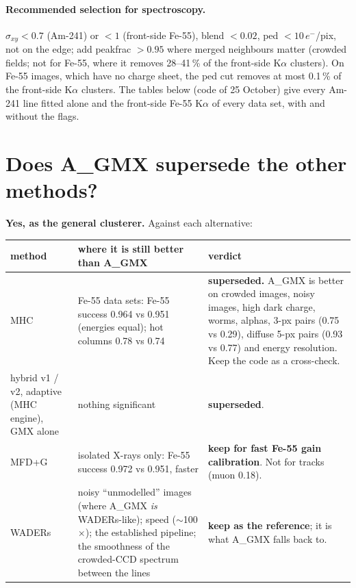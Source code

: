 \documentclass[11pt,a4paper]{article}
\newcommand{\el}{\ensuremath{e^-}}
\newcommand{\AGMX}{A\_GMX}
\begin{document}
\paragraph{Recommended selection for spectroscopy.} $\sigma_{xy}<0.7$ (Am-241) or $<1$ (front-side Fe-55), blend $<0.02$,
ped $<10$\,\el/pix, not on the edge; add peakfrac $>0.95$ where merged neighbours matter (crowded fields; not for Fe-55, where it
removes 28--41\,\% of the front-side K$\alpha$ clusters). On Fe-55 images, which have no charge sheet, the ped cut removes at
most 0.1\,\% of the front-side K$\alpha$ clusters. The tables below (code of 25 October) give every Am-241 line fitted alone and
the front-side Fe-55 K$\alpha$ of every data set, with and without the flags.


\section{Does \AGMX{} supersede the other methods?}\label{sec:supersede}

\textbf{Yes, as the general clusterer.} Against each alternative:

\begin{table}[H]\centering\footnotesize
\begin{tabularx}{\textwidth}{l>{\raggedright\arraybackslash}X>{\raggedright\arraybackslash}X}
\toprule
method & where it is still better than \AGMX & verdict \\
\midrule
MHC & Fe-55 data sets: Fe-55 success 0.964 vs 0.951 (energies equal); hot columns 0.78 vs 0.74 & \textbf{superseded.} \AGMX{} is
better on crowded images, noisy images, high dark charge, worms, alphas, 3-px pairs (0.75 vs 0.29), diffuse 5-px pairs (0.93 vs
0.77) and energy resolution. Keep the code as a cross-check. \\
hybrid v1 / v2, adaptive (MHC engine), GMX alone & nothing significant & \textbf{superseded}. \\
MFD+G & isolated X-rays only: Fe-55 success 0.972 vs 0.951, faster & \textbf{keep for fast Fe-55 gain calibration}. Not for
tracks (muon 0.18). \\
WADERs & noisy ``unmodelled'' images (where \AGMX{} \emph{is} WADERs-like); speed ($\sim$100$\times$); the established pipeline;
the smoothness of the crowded-CCD spectrum between the lines & \textbf{keep as the reference}; it is what \AGMX{} falls back to. \\
\bottomrule
\end{tabularx}
\end{table}
\end{document}
